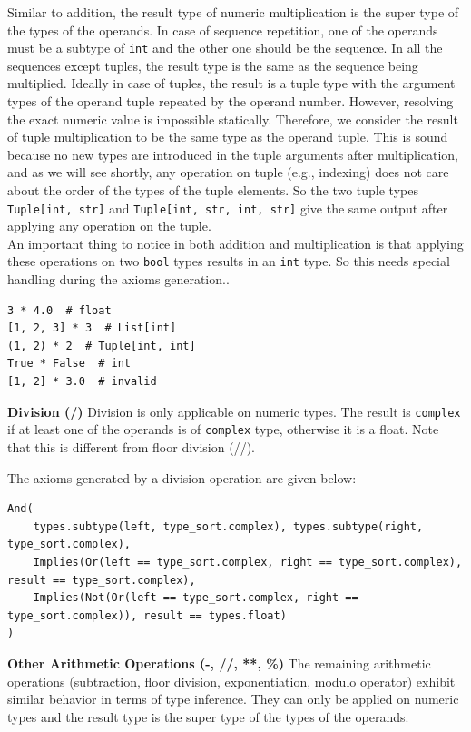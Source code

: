 Similar to addition, the result type of numeric multiplication is the super type of the types of the operands. In case of sequence repetition, one of the operands must be a subtype of \lstinline|int| and the other one should be the sequence. In all the sequences except tuples, the result type is the same as the sequence being multiplied. Ideally in case of tuples, the result is a tuple type with the argument types of the operand tuple repeated by the operand number. However, resolving the exact numeric value is impossible statically. Therefore, we consider the result of tuple multiplication to be the same type as the operand tuple. This is sound because no new types are introduced in the tuple arguments after multiplication, and as we will see shortly, any operation on tuple (e.g., indexing) does not care about the order of the types of the tuple elements. So the two tuple types \lstinline|Tuple[int, str]| and \lstinline|Tuple[int, str, int, str]| give the same output after applying any operation on the tuple.\\

An important thing to notice in both addition and multiplication is that applying these operations on two \lstinline|bool| types results in an \lstinline|int| type. So this needs special handling during the axioms generation..

\begin{lstlisting}
3 * 4.0  # float
[1, 2, 3] * 3  # List[int]
(1, 2) * 2  # Tuple[int, int]
True * False  # int
[1, 2] * 3.0  # invalid
\end{lstlisting}

\textbf{Division (/)} Division is only applicable on numeric types. The result is \lstinline|complex| if at least one of the operands is of \lstinline|complex| type, otherwise it is a float. Note that this is different from floor division (//).

The axioms generated by a division operation are given below:

\begin{lstlisting}
And(
	types.subtype(left, type_sort.complex), types.subtype(right, type_sort.complex),
	Implies(Or(left == type_sort.complex, right == type_sort.complex), result == type_sort.complex),
	Implies(Not(Or(left == type_sort.complex, right == type_sort.complex)), result == types.float)
)
\end{lstlisting}

\textbf{Other Arithmetic Operations (-, //, **, \%)}
The remaining arithmetic operations (subtraction, floor division, exponentiation, modulo operator) exhibit similar behavior in terms of type inference. They can only be applied on numeric types and the result type is the super type of the types of the operands. \\

